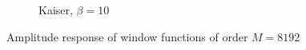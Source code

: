 \begin{figure}[H]
\begin{subfigure}{0.49\textwidth}
\caption{Kaiser, $\beta=10$}
\end{subfigure}

\caption{Amplitude response of window functions of order $M=8192$}
\label{fig:db_plots_8192}
\end{figure}



